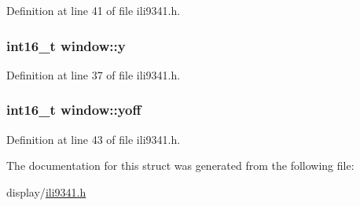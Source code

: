 Definition at line 41 of file ili9341.\-h.

\hypertarget{structwindow_a95c7023fc42e79ab42c291b90a490776}{
\subsubsection[{y}]{\setlength{\rightskip}{0pt plus 5cm}int16\-\_\-t window\-::y}}\label{structwindow_a95c7023fc42e79ab42c291b90a490776}


Definition at line 37 of file ili9341.\-h.

\hypertarget{structwindow_a95c482caa25e4a283d962643d410bc29}{
\subsubsection[{yoff}]{\setlength{\rightskip}{0pt plus 5cm}int16\-\_\-t window\-::yoff}}\label{structwindow_a95c482caa25e4a283d962643d410bc29}


Definition at line 43 of file ili9341.\-h.



The documentation for this struct was generated from the following file\-:\begin{DoxyCompactItemize}
\item 
display/\hyperlink{ili9341_8h}{ili9341.\-h}\end{DoxyCompactItemize}
